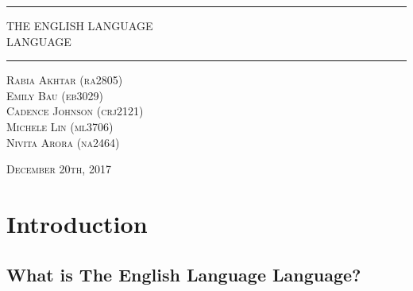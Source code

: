 \documentclass{article}
\begin{document}
\begin{titlepage}
\centering
\vspace*{\baselineskip}
\rule{\textwidth}{1.6pt}\vspace*{-\baselineskip}\vspace*{2pt}
\newline \newline
{\LARGE THE ENGLISH LANGUAGE\\ LANGUAGE\\}
\vspace{0.75\baselineskip}
\rule{\textwidth}{1.6pt}
\vspace{2\baselineskip}
\vspace*{3\baselineskip}

{\scshape\large Rabia Akhtar (ra2805) \\ Emily Bau (eb3029) \\ Cadence Johnson (crj2121) \\ Michele Lin (ml3706) \\ Nivita Arora (na2464) \\}

\vfill

{\scshape\large December 20th, 2017}

\end{titlepage}

\newpage
\tableofcontents

\newpage
\section{Introduction}
\subsection{What is The English Language Language?}
\end{document}
